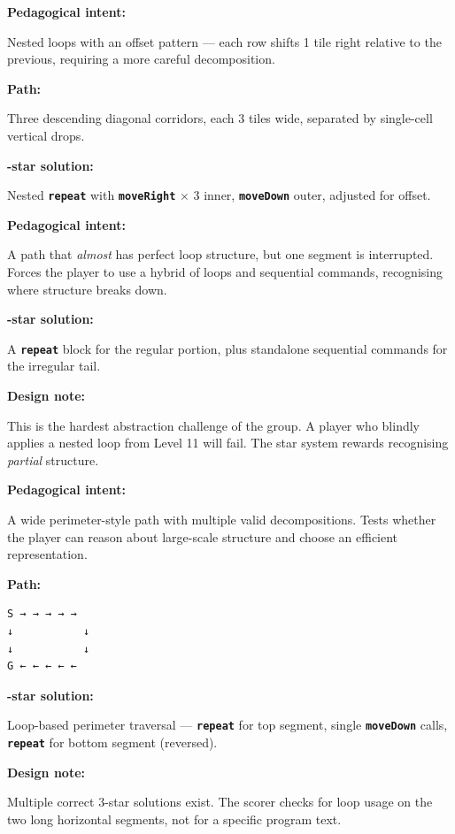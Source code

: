 \documentclass[12pt,a4paper]{article}
\newcommand{\keyword}[1]{\textcolor{keyword}{\texttt{\bfseries #1}}}
\newcommand{\gddfield}[2]{%
  \noindent\begin{minipage}[t]{3.5cm}\bfseries\color{accent}\sffamily#1\end{minipage}%
  \hspace{8pt}%
  \begin{minipage}[t]{\dimexpr\linewidth-3.5cm-8pt\relax}%
    #2
  \end{minipage}\par\smallskip}
\begin{document}
\begin{tcolorbox}[gddbox, title={Level 12 — Stagger Grid}]
\gddfield{Pedagogical intent:}{Nested loops with an offset pattern — each row shifts 1 tile right relative to the previous, requiring a more careful decomposition.}
\gddfield{Path:}{Three descending diagonal corridors, each 3 tiles wide, separated by single-cell vertical drops.}
\gddfield{3-star solution:}{Nested \keyword{repeat} with \keyword{moveRight} $\times$ 3 inner, \keyword{moveDown} outer, adjusted for offset.}
\end{tcolorbox}

\begin{tcolorbox}[gddbox, title={Level 13 — Broken Symmetry}]
\gddfield{Pedagogical intent:}{A path that \emph{almost} has perfect loop structure, but one segment is interrupted. Forces the player to use a hybrid of loops and sequential commands, recognising where structure breaks down.}
\gddfield{3-star solution:}{A \keyword{repeat} block for the regular portion, plus standalone sequential commands for the irregular tail.}
\gddfield{Design note:}{This is the hardest abstraction challenge of the group. A player who blindly applies a nested loop from Level 11 will fail. The star system rewards recognising \emph{partial} structure.}
\end{tcolorbox}

\begin{tcolorbox}[gddbox, title={Level 14 — Wide Traversal}]
\gddfield{Pedagogical intent:}{A wide perimeter-style path with multiple valid decompositions. Tests whether the player can reason about large-scale structure and choose an efficient representation.}
\gddfield{Path:}{%
\begin{lstlisting}[language=RobotScript, numbers=none]
S → → → → →
↓           ↓
↓           ↓
G ← ← ← ← ←
\end{lstlisting}}
\gddfield{3-star solution:}{Loop-based perimeter traversal — \keyword{repeat} for top segment, single \keyword{moveDown} calls, \keyword{repeat} for bottom segment (reversed).}
\gddfield{Design note:}{Multiple correct 3-star solutions exist. The scorer checks for loop usage on the two long horizontal segments, not for a specific program text.}
\end{tcolorbox}
\end{document}
